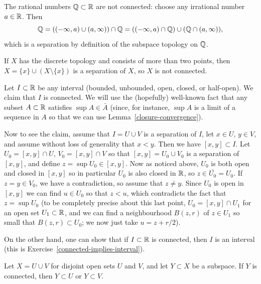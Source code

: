 \begin{example}
  The rational numbers $\mathbb{Q} \subset \mathbb{R}$ are not connected: choose any irrational number $a \in \mathbb{R}$. Then
  \[
    \mathbb{Q} = ((-\infty, a) \cup (a,\infty)) \cap \mathbb{Q} = ((-\infty,a) \cap \mathbb{Q}) \cup (\mathbb{Q} \cap (a,\infty)),
  \]
  which is a separation by definition of the subspace topology on $\mathbb{Q}$.
\end{example}
\begin{example}
  \label{discrete-connectedness}
  If $X$ has the discrete topology and consists of more than two points, then $X = \{x\} \cup (X \setminus \{x\})$ is a separation of $X$, so $X$ is not connected.
\end{example}
\begin{example}
  \label{intervals-are-connected}
  Let $I \subset \mathbb{R}$ be any interval (bounded, unbounded, open, closed, or half-open). We claim that $I$ is connected. We will use the (hopefully) well-known fact that any subset $A \subset \mathbb{R}$ satisfies $\sup A \in \bar A$ (since, for instance, $\sup A$ is a limit of a sequence in $A$ so that we can use Lemma~\ref{closure-convergence}).
  
  Now to see the claim, assume that $I = U \cup V$ is a separation of $I$, let $x \in U$, $y \in V$, and assume without loss of generality that $x < y$. Then we have $[x,y] \subset I$. Let $U_0 = [x,y] \cap U$, $V_0 = [x,y] \cap V$ so that $[x,y] = U_0 \cup V_0$ is a separation of $[x,y]$, and define $z = \sup U_0 \in [x,y]$. Now as noticed above, $U_0$ is both open and closed in $[x,y]$ so in particular $U_0$ is also closed in $\mathbb{R}$, so $z \in \bar{U_0} = U_0$. If $z = y \in V_0$, we have a contradiction, so assume that $z \not= y$. Since $U_0$ is open in $[x,y]$ we can find $u \in U_0$ so that $z < u$, which contradicts the fact that $z = \sup U_0$ (to be completely precise about this last point, $U_0 = [x,y] \cap U_1$ for an open set $U_1 \subset \mathbb{R}$, and we can find a neighbourhood $B(z,r)$ of $z \in U_1$ so small that $B(z,r) \subset U_0$; we now just take $u = z+r/2$).
  
  On the other hand, one can show that if $I \subset \mathbb{R}$ is connected, then $I$ is an interval (this is Exercise~\ref{connected-implies-interval}).
\end{example}
\begin{lem}
  \label{connectedness-subspace-lemma}
  Let $X = U \cup V$ for disjoint open sets $U$ and $V$, and let $Y \subset X$ be a subspace. If $Y$ is connected, then $Y \subset U$ or $Y \subset V$.
\end{lem}
